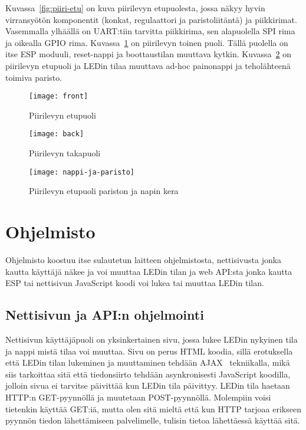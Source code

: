 Kuvassa~\ref{fig:piiri-etu} on kuva piirilevyn etupuolesta, jossa näkyy hyvin
virransyötön komponentit (konkat, regulaattori ja paristoliitäntä) ja
piikkirimat. Vasemmalla ylhäällä on UART:tiin tarvitta piikkirima, sen
alapuolella SPI rima ja oikealla GPIO rima. Kuvassa~\ref{fig:piiri-taka} on
piirilevyn toinen puoli. Tällä puolella on itse ESP moduuli, reset-nappi ja
boottaustilan muuttava kytkin. Kuvassa~\ref{fig:nappi-ja-paristo} on piirilevyn
etupuoli ja LEDin tilaa muuttava ad-hoc painonappi ja teholähteenä toimiva
paristo.
\begin{figure}[H]
\centering
\begin{minipage}{.5\textwidth}
  \centering
  \texttt{[image: front]}
  \caption{Piirilevyn etupuoli}
\label{fig:piiri-etu}
\end{minipage}%
\begin{minipage}{.5\textwidth}
  \centering
  \texttt{[image: back]}
  \caption{Piirilevyn takapuoli}
\label{fig:piiri-taka}
\end{minipage}
\end{figure}
\begin{figure}[H]
  \centering
  \texttt{[image: nappi-ja-paristo]}
  \caption{Piirilevyn etupuoli pariston ja napin kera}
\label{fig:nappi-ja-paristo}
\end{figure}

\section{Ohjelmisto}
Ohjelmisto koostuu itse sulautetun laitteen ohjelmistosta, nettisivusta jonka
kautta käyttäjä näkee ja voi muuttaa LEDin tilan ja web API:sta jonka kautta
ESP tai nettisivun JavaScript koodi voi lukea tai muuttaa LEDin tilan.

\subsection{Nettisivun ja API:n ohjelmointi}
Nettisivun käyttäjäpuoli on yksinkertainen sivu, jossa lukee LEDin nykyinen
tila ja nappi mistä tilaa voi muuttaa. Sivu on perus HTML koodia, sillä
erotuksella että LEDin tilan lukeminen ja muuttaminen tehdään AJAX~\cite{ajax}
tekniikalla, mikä siis tarkoittaa sitä että tiedonsiirto tehdään asynkronisesti
JavaScript koodilla, jolloin sivua ei tarvitse päivittää kun LEDin tila
päivittyy. LEDin tila haetaan HTTP:n GET-pyynnöllä ja muutetaan POST-pyynnöllä.
Molempiin voisi tietenkin käyttää GET:iä, mutta olen sitä mieltä että kun HTTP
tarjoaa erikseen pyynnön tiedon lähettämiseen palvelimelle, tulisin tietoa
lähettäessä käyttää sitä.


